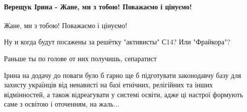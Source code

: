  
 
 
 
 
\paragraph{Верещук Ірина - Жане, ми з тобою! Поважаємо і цінуємо!}

\begin{itemize}
 

Жане, ми з тобою! Поважаємо і цінуємо!

\begin{itemize}
 
Ну и когда будут посажены за решётку "активисты" С14? Или "Фрайкора"?

 
Раньше ты по голове от них получишь, сепаратист

 

Ірина на додачу до поваги було б гарно ще б підготувати законодавчу базу для
захисту українців від ненависті на базі етнічних, релігійних та інших
відмінностей, а також відреагувати у системі освіти, адже ці настрої формують
саме з освітою і оточенням, на жаль...



\end{itemize}
\end{itemize}

